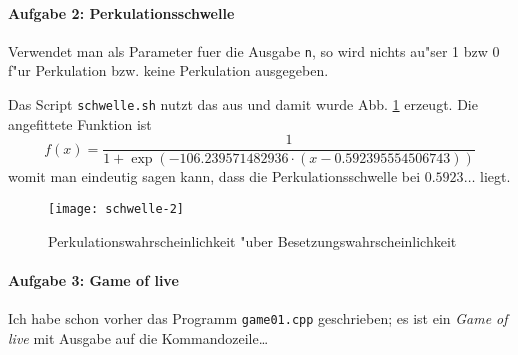 \documentclass[a4paper,12pt]{article}
\begin{document}
\paragraph{Aufgabe 2: Perkulationsschwelle}

Verwendet man als Parameter fuer die Ausgabe \verb+n+, so wird nichts au"ser 1
bzw 0 f"ur Perkulation bzw. keine Perkulation ausgegeben.

Das Script \texttt{schwelle.sh} nutzt das aus und damit wurde Abb. \ref{fig:schwelle} erzeugt. Die angefittete Funktion ist
\begin{equation}
	f(x) = \frac{1}{1 + \exp( - 106.239571482936 \cdot (x - 0.592395554506743) )}
	\label{eq:fit}
\end{equation}
womit man eindeutig sagen kann, dass die Perkulationsschwelle bei $0.5923\dots$ liegt.

\begin{figure}
	\begin{center}
		\texttt{[image: schwelle-2]}
	\end{center}
	\caption{Perkulationswahrscheinlichkeit "uber Besetzungswahrscheinlichkeit}
	\label{fig:schwelle}
\end{figure}


\paragraph{Aufgabe 3: Game of live}

Ich habe schon vorher das Programm \texttt{game01.cpp} geschrieben; es ist ein
\textit{Game of live} mit Ausgabe auf die Kommandozeile\dots
\end{document}
